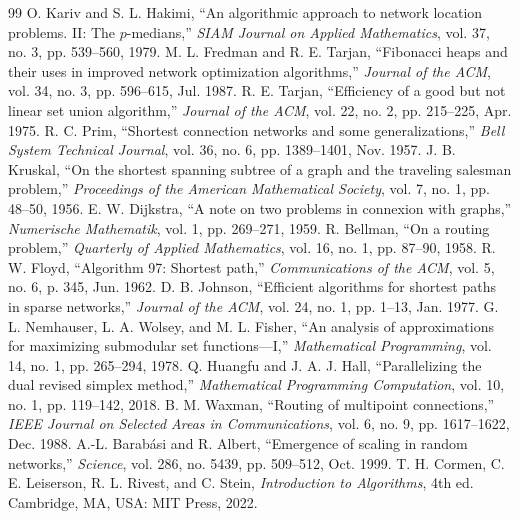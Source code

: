 \renewcommand{\refname}{References}
\begin{thebibliography}{99}\footnotesize\linespread{1.0}\selectfont
\setlength{\itemsep}{2pt}
 O. Kariv and S. L. Hakimi, ``An algorithmic approach to network location problems. II: The $p$-medians,'' \emph{SIAM Journal on Applied Mathematics}, vol. 37, no. 3, pp. 539--560, 1979.
 M. L. Fredman and R. E. Tarjan, ``Fibonacci heaps and their uses in improved network optimization algorithms,'' \emph{Journal of the ACM}, vol. 34, no. 3, pp. 596--615, Jul. 1987.
 R. E. Tarjan, ``Efficiency of a good but not linear set union algorithm,'' \emph{Journal of the ACM}, vol. 22, no. 2, pp. 215--225, Apr. 1975.
 R. C. Prim, ``Shortest connection networks and some generalizations,'' \emph{Bell System Technical Journal}, vol. 36, no. 6, pp. 1389--1401, Nov. 1957.
 J. B. Kruskal, ``On the shortest spanning subtree of a graph and the traveling salesman problem,'' \emph{Proceedings of the American Mathematical Society}, vol. 7, no. 1, pp. 48--50, 1956.
 E. W. Dijkstra, ``A note on two problems in connexion with graphs,'' \emph{Numerische Mathematik}, vol. 1, pp. 269--271, 1959.
 R. Bellman, ``On a routing problem,'' \emph{Quarterly of Applied Mathematics}, vol. 16, no. 1, pp. 87--90, 1958.
 R. W. Floyd, ``Algorithm 97: Shortest path,'' \emph{Communications of the ACM}, vol. 5, no. 6, p. 345, Jun. 1962.
 D. B. Johnson, ``Efficient algorithms for shortest paths in sparse networks,'' \emph{Journal of the ACM}, vol. 24, no. 1, pp. 1--13, Jan. 1977.
 G. L. Nemhauser, L. A. Wolsey, and M. L. Fisher, ``An analysis of approximations for maximizing submodular set functions---I,'' \emph{Mathematical Programming}, vol. 14, no. 1, pp. 265--294, 1978.
 Q. Huangfu and J. A. J. Hall, ``Parallelizing the dual revised simplex method,'' \emph{Mathematical Programming Computation}, vol. 10, no. 1, pp. 119--142, 2018.
 B. M. Waxman, ``Routing of multipoint connections,'' \emph{IEEE Journal on Selected Areas in Communications}, vol. 6, no. 9, pp. 1617--1622, Dec. 1988.
 A.-L. Barab\'asi and R. Albert, ``Emergence of scaling in random networks,'' \emph{Science}, vol. 286, no. 5439, pp. 509--512, Oct. 1999.
 T. H. Cormen, C. E. Leiserson, R. L. Rivest, and C. Stein, \emph{Introduction to Algorithms}, 4th ed. Cambridge, MA, USA: MIT Press, 2022.
\end{thebibliography}
